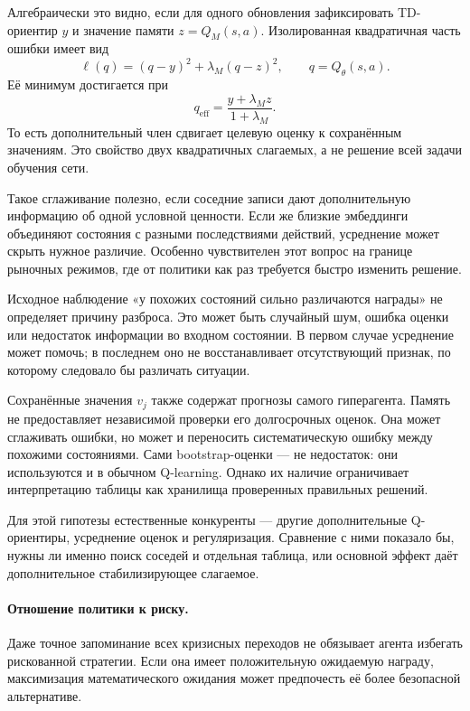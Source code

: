 \documentclass[9pt,a4paper,twocolumn]{extarticle}
\begin{document}
Алгебраически это видно, если для одного обновления зафиксировать TD-ориентир $y$ и значение
памяти $z=Q_M(s,a)$. Изолированная квадратичная часть ошибки имеет вид
\begin{equation}
  \ell(q)
  =
  (q-y)^2+\lambda_M(q-z)^2,
  \qquad q=Q_\theta(s,a).
  \label{eq:two_targets_loss}
\end{equation}
Её минимум достигается при
\begin{equation}
  q_{\mathrm{eff}}
  =
  \frac{y+\lambda_M z}{1+\lambda_M}.
  \label{eq:effective_memory_target}
\end{equation}
То есть дополнительный член сдвигает целевую оценку к сохранённым значениям. Это свойство двух
квадратичных слагаемых, а не решение всей задачи обучения сети.

Такое сглаживание полезно, если соседние записи дают дополнительную информацию об одной условной
ценности. Если же близкие эмбеддинги объединяют состояния с разными последствиями действий,
усреднение может скрыть нужное различие. Особенно чувствителен этот вопрос на границе рыночных
режимов, где от политики как раз требуется быстро изменить решение.

Исходное наблюдение «у похожих состояний сильно различаются награды» не определяет причину
разброса. Это может быть случайный шум, ошибка оценки или недостаток информации во входном
состоянии. В первом случае усреднение может помочь; в последнем оно не восстанавливает
отсутствующий признак, по которому следовало бы различать ситуации.

Сохранённые значения $v_j$ также содержат прогнозы самого гиперагента. Память не предоставляет
независимой проверки его долгосрочных оценок. Она может сглаживать ошибки, но может и переносить
систематическую ошибку между похожими состояниями. Сами bootstrap-оценки --- не недостаток: они
используются и в обычном Q-learning. Однако их наличие ограничивает интерпретацию таблицы как
хранилища проверенных правильных решений.

Для этой гипотезы естественные конкуренты --- другие дополнительные Q-ориентиры, усреднение
оценок и регуляризация. Сравнение с ними показало бы, нужны ли именно поиск соседей и отдельная
таблица, или основной эффект даёт дополнительное стабилизирующее слагаемое.

\paragraph{Отношение политики к риску.}

Даже точное запоминание всех кризисных переходов не обязывает агента избегать рискованной
стратегии. Если она имеет положительную ожидаемую награду, максимизация математического ожидания
может предпочесть её более безопасной альтернативе.
\end{document}
